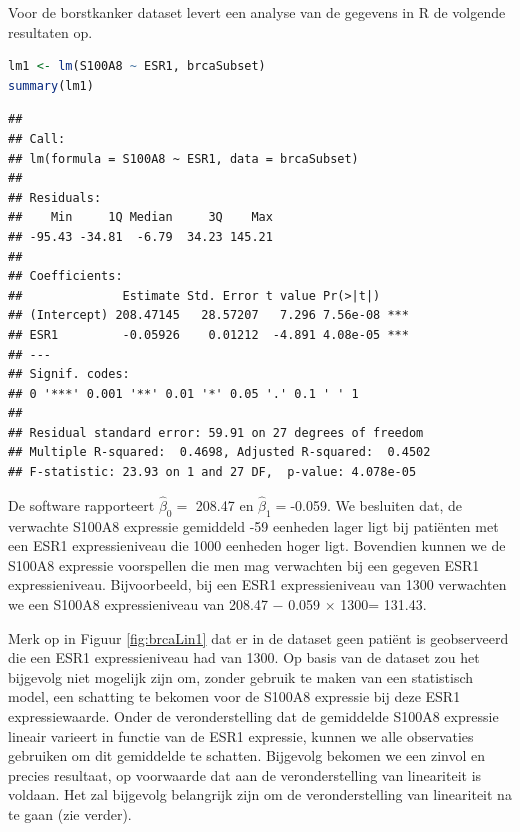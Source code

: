 \documentclass[
  12pt,dutch,coursenotes]{book}
\begin{document}
Voor de borstkanker dataset levert een analyse van de gegevens in R de volgende resultaten op.

\begin{lstlisting}[language=R]
lm1 <- lm(S100A8 ~ ESR1, brcaSubset)
summary(lm1)
\end{lstlisting}

\begin{lstlisting}
## 
## Call:
## lm(formula = S100A8 ~ ESR1, data = brcaSubset)
## 
## Residuals:
##    Min     1Q Median     3Q    Max 
## -95.43 -34.81  -6.79  34.23 145.21 
## 
## Coefficients:
##              Estimate Std. Error t value Pr(>|t|)    
## (Intercept) 208.47145   28.57207   7.296 7.56e-08 ***
## ESR1         -0.05926    0.01212  -4.891 4.08e-05 ***
## ---
## Signif. codes:  
## 0 '***' 0.001 '**' 0.01 '*' 0.05 '.' 0.1 ' ' 1
## 
## Residual standard error: 59.91 on 27 degrees of freedom
## Multiple R-squared:  0.4698, Adjusted R-squared:  0.4502 
## F-statistic: 23.93 on 1 and 27 DF,  p-value: 4.078e-05
\end{lstlisting}

De software rapporteert \(\hat{\beta}_0=\) 208.47 en \(\hat{\beta}_1=\)-0.059. We besluiten dat, de verwachte S100A8 expressie gemiddeld -59 eenheden lager ligt bij patiënten met een ESR1 expressieniveau die 1000 eenheden hoger ligt.
Bovendien kunnen we de S100A8 expressie voorspellen die men mag verwachten bij een gegeven ESR1 expressieniveau. Bijvoorbeeld, bij een ESR1 expressieniveau van 1300 verwachten we een S100A8 expressieniveau van 208.47 \(-\) 0.059 \(\times\) 1300= 131.43.

Merk op in Figuur \ref{fig:brcaLin1} dat er in de dataset geen patiënt is geobserveerd die een ESR1 expressieniveau had van 1300. Op basis van de dataset zou het bijgevolg niet mogelijk zijn om, zonder gebruik te maken van een statistisch model, een schatting te bekomen voor de S100A8 expressie bij deze ESR1 expressiewaarde. Onder de veronderstelling dat de gemiddelde S100A8 expressie lineair varieert in functie van de ESR1 expressie, kunnen we alle observaties gebruiken om dit gemiddelde te schatten. Bijgevolg bekomen we een zinvol en precies resultaat, op voorwaarde dat aan de veronderstelling van lineariteit is voldaan. Het zal bijgevolg belangrijk zijn om de veronderstelling van lineariteit na te gaan (zie verder).
\end{document}
